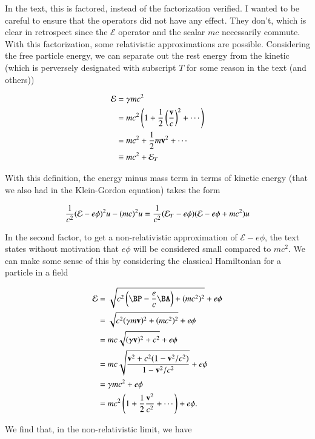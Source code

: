 In the text, this is factored, instead of the factorization verified.  I wanted to be careful to ensure that the operators did not have any effect.  They don't, which is clear in retrospect since the $\mathcal{E}$ operator and the scalar $mc$ necessarily commute.  With this factorization, some relativistic approximations are possible.  Considering the free particle energy, we can separate out the rest energy from the kinetic (which is perversely designated with subscript $T$ for some reason in the text (and others))

\begin{align*}
\mathcal{E}
&= \gamma m c^2  \\
&= m c^2 \left( 1 + \frac{1}{2} \left(\frac{\mathbf{v}}{c}\right)^2 + \cdots \right) \\
&= m c^2 + \frac{1}{2} m \mathbf{v}^2 + \cdots \\
&\equiv m c^2 + \mathcal{E}_{T}
\end{align*}

With this definition, the energy minus mass term in terms of kinetic energy (that we also had in the Klein-Gordon equation) takes the form

\begin{equation}\label{eqn:diracGauge:420}
\frac{1}{c^2} ( \mathcal{E} - e \phi )^2 u - (m c)^2 u
=
\frac{1}{c^2} ( \mathcal{E}_{T} - e \phi ) ( \mathcal{E} - e \phi + m c^2) u
\end{equation}

In the second factor, to get a non-relativistic approximation of $\mathcal{E} - e \phi$, the text states without motivation that $e \phi$ will be considered small compared to $m c^2$.  We can make some sense of this by considering the classical Hamiltonian for a particle in a field

\begin{align*}
\mathcal{E}
&= \sqrt{ c^2 \left(\BP - \frac{e}{c} \BA\right) + (m c^2)^2 } + e \phi \\
&= \sqrt{ c^2 (\gamma m \Bv)^2 + (m c^2)^2 } + e \phi \\
&= m c \sqrt{ (\gamma \Bv)^2 + c^2 } + e \phi \\
&= m c \sqrt{ \frac{ \Bv^2 + c^2 ( 1 - \Bv^2/c^2) } { 1 - \Bv^2/c^2 } } + e \phi \\
&= \gamma m c^2 + e \phi \\
&= m c^2 \left( 1 + \inv{2} \frac{\Bv^2}{c^2} + \cdots \right) + e \phi.
\end{align*}

We find that, in the non-relativistic limit, we have

